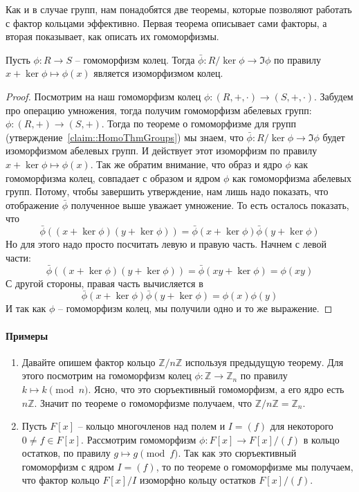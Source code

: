 Как и в случае групп, нам понадобятся две теоремы, которые позволяют работать с фактор кольцами эффективно. Первая теорема описывает сами факторы, а вторая показывает, как описать их гомоморфизмы.

\begin{claim}
Пусть $\phi\colon R\to S$ -- гомоморфизм колец. Тогда $\bar \phi \colon R/\ker \phi \to \Im \phi$ по правилу $x + \ker \phi \mapsto \phi(x)$ является изоморфизмом колец.
\end{claim}
\begin{proof}
Посмотрим на наш гомоморфизм колец $\phi\colon (R, +, \cdot) \to (S, +, \cdot)$.
Забудем про операцию умножения, тогда получим гомоморфизм абелевых групп: $\phi \colon (R, +) \to (S, +)$.
Тогда по теореме о гомоморфизме для групп (утверждение~\ref{claim::HomoThmGroups}) мы знаем, что $\bar \phi \colon R/\ker \phi \to \Im\phi$ будет изоморфизмом абелевых групп.
И действует этот изоморфизм по правилу $x + \ker \phi \mapsto \phi(x)$.
Так же обратим внимание, что образ и ядро $\phi$ как гомоморфизма колец, совпадает с образом и ядром $\phi$ как гомоморфизма абелевых групп.
Потому, чтобы завершить утверждение, нам лишь надо показать, что отображение $\bar\phi$ полученное выше уважает умножение.
То есть осталось показать, что
\[
\bar\phi((x + \ker \phi) (y + \ker \phi)) = \bar \phi(x + \ker \phi) \bar \phi (y + \ker \phi)
\]
Но для этого надо просто посчитать левую и правую часть.
Начнем с левой части:
\[
\bar\phi((x + \ker \phi) (y + \ker \phi)) = \bar\phi(xy + \ker \phi) = \phi(xy)
\]
С другой стороны, правая часть вычисляется в
\[
 \bar \phi(x + \ker \phi) \bar \phi (y + \ker \phi) = \phi(x) \phi(y)
\]
И так как $\phi$ -- гомоморфизм колец, мы получили одно и то же выражение.
\end{proof}

\paragraph{Примеры}

\begin{enumerate}
\item Давайте опишем фактор кольцо $\mathbb Z / n \mathbb Z$ используя предыдущую теорему.
Для этого посмотрим на гомоморфизм колец $\phi \colon \mathbb Z\to \mathbb Z_n$ по правилу $k \mapsto k \pmod n$.
Ясно, что это сюръективный гомоморфизм, а его ядро есть $n \mathbb Z$.
Значит по теореме о гомоморфизме получаем, что $\mathbb Z/ n \mathbb Z = \mathbb Z_n$.

\item Пусть $F[x]$ -- кольцо многочленов над полем и $I = (f)$ для некоторого $0\neq f \in F[x]$.
Рассмотрим гомоморфизм $\phi\colon F[x]\to F[x]/(f)$ в кольцо остатков, по правилу $g \mapsto g \pmod f$.
Так как это сюръективный гомоморфизм с ядром $I = (f)$, то по теореме о гомоморфизме мы получаем, что фактор кольцо $F[x] / I$ изоморфно кольцу остатков $F[x]/(f)$.
\end{enumerate}

